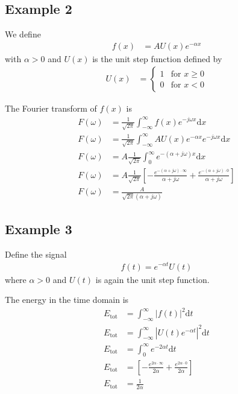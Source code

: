 \documentclass[twocolumn]{myarticle}
\renewcommand{\d}{\mathrm{d}}
\begin{document}
\subsection{Example 2}
\label{subsec:example_2}

We define
\begin{align}
    f(x) &= A U(x) e^{-\alpha x}
\end{align}
with $ \alpha > 0 $ and $ U(x) $ is the unit step function defined by
\begin{align}
    U(x) &= \begin{cases} 1 & \text{for } x \geq 0 \\ 0 & \text{for } x < 0 \end{cases}
\end{align}

The Fourier transform of $ f(x) $ is
\begin{align}
    F(\omega) &= \frac{1}{\sqrt{2 \pi}} \int_{-\infty}^{\infty} f(x) e^{-j \omega x} \d x
    \\
    F(\omega) &= \frac{1}{\sqrt{2 \pi}} \int_{-\infty}^{\infty} A U(x) e^{-\alpha x} e^{-j \omega x} \d x
    \\
    F(\omega) &= A \frac{1}{\sqrt{2 \pi}} \int_{0}^{\infty} e^{-(\alpha + j \omega) x} \d x
    \\
    F(\omega) &= A \frac{1}{\sqrt{2 \pi}} \left[ -\frac{e^{-(\alpha + j \omega) \cdot \infty}}{\alpha + j \omega} + \frac{e^{-(\alpha + j \omega) \cdot 0}}{\alpha + j \omega} \right]
    \\
    F(\omega) &= \frac{A}{\sqrt{2 \pi}(\alpha + j \omega)} 
\end{align}

\subsection{Example 3}
\label{subsec:example_3}

Define the signal 
\begin{align}
    f(t) = e^{-\alpha t} U(t) 
\end{align}
where $ \alpha > 0 $ and $ U(t) $ is again the unit step function.

The energy in the time domain is
\begin{align}
    E_\text{tot} &= \int_{-\infty}^{\infty} \left| f(t) \right|^2 \d t
    \\
    E_\text{tot} &= \int_{-\infty}^{\infty} \left| U(t) e^{-\alpha t} \right|^2 \d t
    \\
    E_\text{tot} &= \int_{0}^{\infty} e^{-2 \alpha t} \d t
    \\
    E_\text{tot} &= \left[ - \frac{e^{2 \alpha \cdot \infty}}{2 \alpha} + \frac{e^{2 \alpha \cdot 0}}{2 \alpha} \right]
    \\
    E_\text{tot} &= \frac{1}{2 \alpha}
\end{align}
\end{document}
